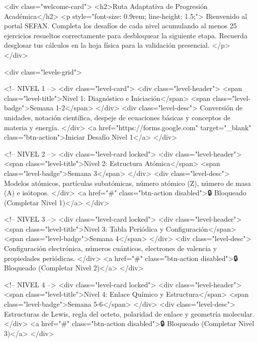         <div class="welcome-card">
            <h2>Ruta Adaptativa de Progresión Académica</h2>
            <p style="font-size: 0.9rem; line-height: 1.5;">
                Bienvenido al portal SEFAN. Completa los desafíos de cada nivel acumulando al menos 25 ejercicios resueltos correctamente para desbloquear la siguiente etapa. Recuerda desglosar tus cálculos en la hoja física para la validación presencial.
            </p>
        </div>

        <div class="levels-grid">

            <!-- NIVEL 1 -->
            <div class="level-card">
                <div class="level-header">
                    <span class="level-title">Nivel 1: Diagnóstico e Iniciación</span>
                    <span class="level-badge">Semana 1-2</span>
                </div>
                <div class="level-desc">
                    Conversión de unidades, notación científica, despeje de ecuaciones básicas y conceptos de materia y energía.
                </div>
                <a href="https://forms.google.com" target="_blank" class="btn-action">Iniciar Desafío Nivel 1</a>
            </div>

            <!-- NIVEL 2 -->
            <div class="level-card locked">
                <div class="level-header">
                    <span class="level-title">Nivel 2: Estructura Atómica</span>
                    <span class="level-badge">Semana 3</span>
                </div>
                <div class="level-desc">
                    Modelos atómicos, partículas subatómicas, número atómico (Z), número de masa (A) e isótopos.
                </div>
                <a href="#" class="btn-action disabled">🔒 Bloqueado (Completar Nivel 1)</a>
            </div>

            <!-- NIVEL 3 -->
            <div class="level-card locked">
                <div class="level-header">
                    <span class="level-title">Nivel 3: Tabla Periódica y Configuración</span>
                    <span class="level-badge">Semana 4</span>
                </div>
                <div class="level-desc">
                    Configuración electrónica, números cuánticos, electrones de valencia y propiedades periódicas.
                </div>
                <a href="#" class="btn-action disabled">🔒 Bloqueado (Completar Nivel 2)</a>
            </div>

            <!-- NIVEL 4 -->
            <div class="level-card locked">
                <div class="level-header">
                    <span class="level-title">Nivel 4: Enlace Químico y Estructura</span>
                    <span class="level-badge">Semana 5-6</span>
                </div>
                <div class="level-desc">
                    Estructuras de Lewis, regla del octeto, polaridad de enlace y geometría molecular.
                </div>
                <a href="#" class="btn-action disabled">🔒 Bloqueado (Completar Nivel 3)</a>
            </div>

